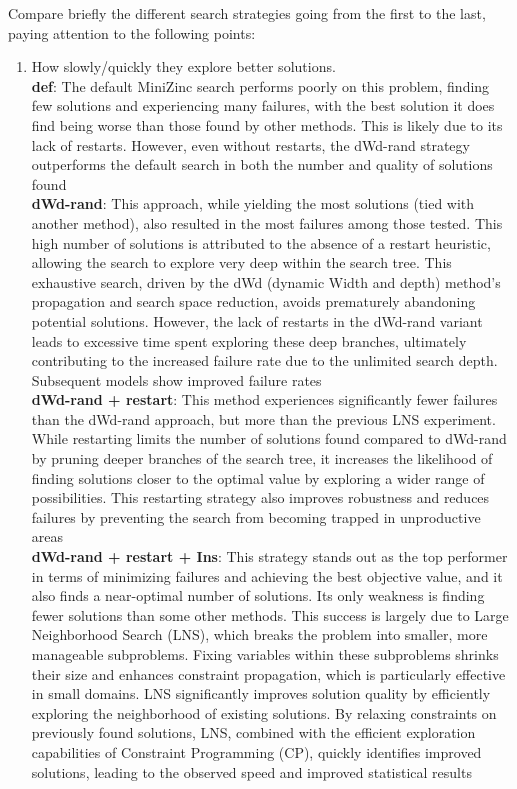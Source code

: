 \documentclass{article}
\begin{document}
Compare briefly the different search strategies going from the first to the last, paying attention to the following points:
\begin{enumerate}
    \item How slowly/quickly they explore better solutions. \\
    \textbf{def}: The default MiniZinc search performs poorly on this problem, finding few solutions and experiencing many failures, with the best solution it does find being worse than those found by other methods. This is likely due to its lack of restarts. However, even without restarts, the dWd-rand strategy outperforms the default search in both the number and quality of solutions found\\
    \textbf{dWd-rand}: This approach, while yielding the most solutions (tied with another method), also resulted in the most failures among those tested. This high number of solutions is attributed to the absence of a restart heuristic, allowing the search to explore very deep within the search tree. This exhaustive search, driven by the dWd (dynamic Width and depth) method's propagation and search space reduction, avoids prematurely abandoning potential solutions. However, the lack of restarts in the dWd-rand variant leads to excessive time spent exploring these deep branches, ultimately contributing to the increased failure rate due to the unlimited search depth. Subsequent models show improved failure rates
    \\
    \textbf{dWd-rand + restart}: This method experiences significantly fewer failures than the dWd-rand approach, but more than the previous LNS experiment. While restarting limits the number of solutions found compared to dWd-rand by pruning deeper branches of the search tree, it increases the likelihood of finding solutions closer to the optimal value by exploring a wider range of possibilities. This restarting strategy also improves robustness and reduces failures by preventing the search from becoming trapped in unproductive areas
    \\
    \textbf{dWd-rand + restart + Ins}: This strategy stands out as the top performer in terms of minimizing failures and achieving the best objective value, and it also finds a near-optimal number of solutions. Its only weakness is finding fewer solutions than some other methods. This success is largely due to Large Neighborhood Search (LNS), which breaks the problem into smaller, more manageable subproblems. Fixing variables within these subproblems shrinks their size and enhances constraint propagation, which is particularly effective in small domains. LNS significantly improves solution quality by efficiently exploring the neighborhood of existing solutions. By relaxing constraints on previously found solutions, LNS, combined with the efficient exploration capabilities of Constraint Programming (CP), quickly identifies improved solutions, leading to the observed speed and improved statistical results

\end{enumerate}
\end{document}
